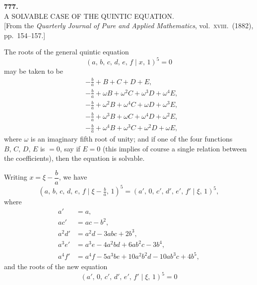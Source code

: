 \documentclass[11pt]{article}
\begin{document}

\begin{center}
\textbf{777.}\\[4pt]
\textsc{A SOLVABLE CASE OF THE QUINTIC EQUATION.}\\[4pt]
[From the \textit{Quarterly Journal of Pure and Applied Mathematics}, vol.\ \textsc{xviii}.\ (1882), pp.\ 154--157.]
\end{center}

\bigskip

\noindent
The roots of the general quintic equation
\[
  (a,\,b,\,c,\,d,\,e,\,f \mid x,\,1)^{5} = 0
\]
may be taken to be
\begin{align*}
  & -\tfrac{b}{a} + B + C + D + E,\\
  & -\tfrac{b}{a} + \omega B + \omega^{2} C + \omega^{3} D + \omega^{4} E,\\
  & -\tfrac{b}{a} + \omega^{2} B + \omega^{4} C + \omega D + \omega^{3} E,\\
  & -\tfrac{b}{a} + \omega^{3} B + \omega C + \omega^{4} D + \omega^{2} E,\\
  & -\tfrac{b}{a} + \omega^{4} B + \omega^{3} C + \omega^{2} D + \omega E,
\end{align*}
where $\omega$ is an imaginary fifth root of unity; and if one of the four
functions $B,\,C,\,D,\,E$ is $=0$, say if $E = 0$ (this implies of course a
single relation between the coefficients), then the equation is solvable.

\medskip
Writing $x = \xi - \dfrac{b}{a}$, we have
\[
  (a,\,b,\,c,\,d,\,e,\,f \mid \xi - \tfrac{b}{a},\,1)^{5}
   = (a',\,0,\,c',\,d',\,e',\,f' \mid \xi,\,1)^{5},
\]
where
\begin{align*}
  a' &= a,\\
  ac' &= ac - b^{2},\\
  a^{2} d' &= a^{2} d - 3abc + 2b^{3},\\
  a^{3} e' &= a^{3} e - 4a^{2} b d + 6 a b^{2} c - 3 b^{4},\\
  a^{4} f' &= a^{4} f - 5 a^{3} b e + 10 a^{2} b^{2} d - 10 a b^{3} c + 4 b^{5},
\end{align*}
and the roots of the new equation
\[
  (a',\,0,\,c',\,d',\,e',\,f' \mid \xi,\,1)^{5} = 0
\]
\end{document}
